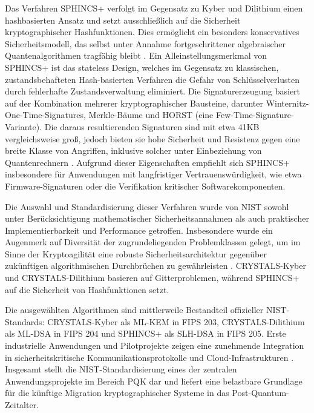 Das Verfahren SPHINCS+ verfolgt im Gegensatz zu Kyber und Dilithium einen hashbasierten Ansatz und setzt ausschließlich auf die Sicherheit kryptographischer Hashfunktionen. Dies ermöglicht ein besonders konservatives Sicherheitsmodell, das selbst unter Annahme fortgeschrittener algebraischer Quantenalgorithmen tragfähig bleibt \cite[s. 1-2]{schwabe_sphincs_2025}. Ein Alleinstellungsmerkmal von SPHINCS+ ist das stateless Design, welches im Gegensatz zu klassischen, zustandsbehafteten Hash-basierten Verfahren die Gefahr von Schlüsselverlusten durch fehlerhafte Zustandsverwaltung eliminiert. Die Signaturerzeugung basiert auf der Kombination mehrerer kryptographischer Bausteine, darunter Winternitz-One-Time-Signatures, Merkle-Bäume und HORST (eine Few-Time-Signature-Variante). Die daraus resultierenden Signaturen sind mit etwa 41KB vergleichsweise groß, jedoch bieten sie hohe Sicherheit und Resistenz gegen eine breite Klasse von Angriffen, inklusive solcher unter Einbeziehung von Quantenrechnern \cite[S. 4-5]{schwabe_sphincs_2025}. Aufgrund dieser Eigenschaften empfiehlt sich SPHINCS+ insbesondere für Anwendungen mit langfristiger Vertrauenswürdigkeit, wie etwa Firmware-Signaturen oder die Verifikation kritischer Softwarekomponenten.

Die Auswahl und Standardisierung dieser Verfahren wurde von NIST sowohl unter Berücksichtigung mathematischer Sicherheitsannahmen als auch praktischer Implementierbarkeit und Performance getroffen. Insbesondere wurde ein Augenmerk auf Diversität der zugrundeliegenden Problemklassen gelegt, um im Sinne der Kryptoagilität eine robuste Sicherheitsarchitektur gegenüber zukünftigen algorithmischen Durchbrüchen zu gewährleisten \cite[S. 4, 9]{alagic_status_2025}. CRYSTALS-Kyber und CRYSTALS-Dilithium basieren auf Gitterproblemen, während SPHINCS+ auf die Sicherheit von Hashfunktionen setzt.

Die ausgewählten Algorithmen sind mittlerweile Bestandteil offizieller NIST-Standards: CRYSTALS-Kyber als ML-KEM in FIPS 203, CRYSTALS-Dilithium als ML-DSA in FIPS 204 und SPHINCS+ als SLH-DSA in FIPS 205. Erste industrielle Anwendungen und Pilotprojekte zeigen eine zunehmende Integration in sicherheitskritische Kommunikationsprotokolle und Cloud-Infrastrukturen \cite{alagic_status_2025, sullivan_securing_2020, weibel_round_2020}. Insgesamt stellt die NIST-Standardisierung eines der zentralen Anwendungsprojekte im Bereich PQK dar und liefert eine belastbare Grundlage für die künftige Migration kryptographischer Systeme in das Post-Quantum-Zeitalter.

